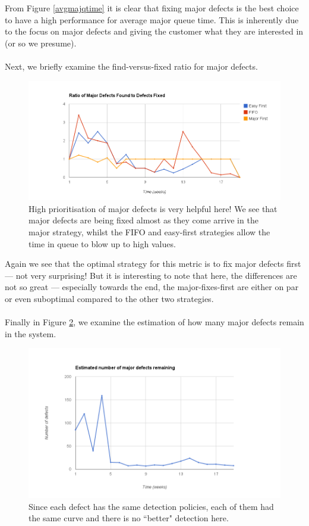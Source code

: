 From Figure \ref{avgmajqtime} it is clear that fixing major defects is the best choice to have a
high performance for average major queue time.
This is inherently due to the focus on major defects and giving the customer what they are
interested in (or so we presume).\\
\\
Next, we briefly examine the find-versus-fixed ratio for major defects.

\pagebreak

\begin{figure}[ht!]
	\centering
	\includegraphics[scale=0.45]{graphs/MajRatioFF.png}
	\caption{High prioritisation of major defects is very helpful here!
	We see that major defects are being fixed almost as they come arrive in the major strategy, whilst
the FIFO and easy-first strategies allow the time in queue to blow up to high values.} 
	\label{majratioff}
\end{figure}

Again we see that the optimal strategy for this metric is to fix major defects first --- not very
surprising!
But it is interesting to note that here, the differences are not so great --- especially towards the
end, the major-fixes-first are either on par or even suboptimal compared to the other two
strategies.\\
\\
Finally in Figure \ref{estremmajdef}, we examine the estimation of how many major defects remain in the system.

\pagebreak

\begin{figure}[ht!]
	\centering
	\includegraphics[scale=0.5]{graphs/EstRemMajDef.png}
	\caption{Since each defect has the same detection policies, each of them had the same curve and
there is no ``better" detection here.} 
	\label{estremmajdef}
\end{figure}


